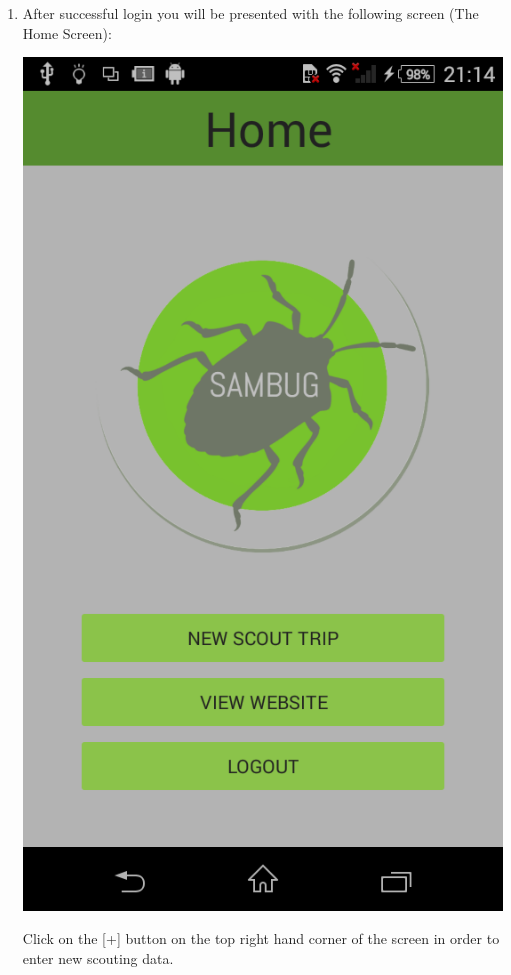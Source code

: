 \documentclass[11pt,a4paper,titlepage]{article}
\begin{document}
\begin{enumerate}
\begin{center}
			\end{center}
		\item After successful login you will be presented with the following screen (The Home Screen):
			\begin{center}
				\includegraphics[scale=0.3]{home_nf}
			\end{center}
			Click on the [+] button on the top right hand corner of the screen in order to enter new scouting data.


\end{enumerate}
\end{document}
